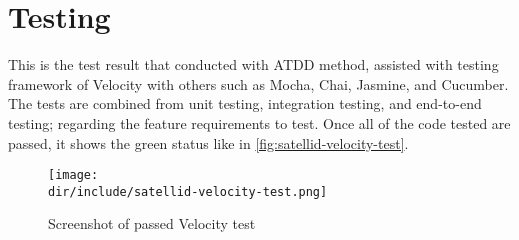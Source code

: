 \clearpage
\section{Testing}
\label{sec:testing}

This is the test result that conducted with \ac{ATDD} method, assisted with testing framework of Velocity with others such as Mocha, Chai, Jasmine, and Cucumber.
The tests are combined from unit testing, integration testing, and end-to-end testing; regarding the feature requirements to test.
Once all of the code tested are passed, it shows the green status like in \autoref{fig:satellid-velocity-test}.

\begin{figure}[htb]
  \centering
  \texttt{[image: \\dir/include/satellid-velocity-test.png]}
  \caption{Screenshot of passed Velocity test}
  \label{fig:satellid-velocity-test}
\end{figure}

